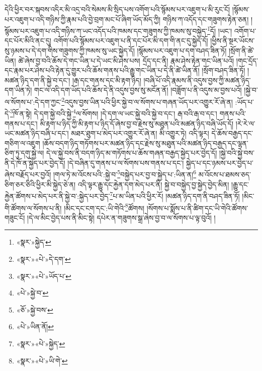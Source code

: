 དེའི་ཕྱིར་བར་སྐབས་འདིར་མི་འདྲ་བའི་སེམས་མི་སྲིད་པས་འགོག་པའི་སྙོམས་པར་འཇུག་པ་མི་རུང་ངོ། །སྙོམས་པར་འཇུག་པ་འདི་གཉིས་ཀྱི་རྣམ་པའི་བྱེ་བྲག་མང་པོ་ཞིག་ཡོད་མོད་ཀྱི། གཉིས་ཀ་འདོད་དང་གཟུགས་རྟེན་ཅན། །སྙོམས་པར་འཇུག་པ་འདི་གཉིས་ཀ་ཡང་འདོད་པའི་ཁམས་དང་གཟུགས་ཀྱི་ཁམས་སུ་བསྐྱེད་\footnote{«སྣར་»སྐྱེད་}དོ། །ཡང་། འགོག་པ་དང་པོར་མིའི་ནང་དུ། འགོག་པའི་སྙོམས་པར་འཇུག་པ་ནི་དང་པོར་མི་དག་གི་ནང་དུ་སྐྱེད་དོ། །ཕྱིས་ནི་སྔར་ཡོངས་སུ་ཉམས་པ་དེ་དག་གིས་གཟུགས་ཀྱི་ཁམས་སུ་ཡང་སྐྱེད་དོ། །སྙོམས་པར་འཇུག་པ་དག་བཤད་ཟིན་ཏོ། །སྲོག་ནི་ཚེ་ཡིན། ཚེ་ཞེས་བྱ་བའི་ཆོས་དེ་གང་ཡིན་པ་དེ་ཡང་མི་ཤེས་པས། དྲོད་དང་ནི། རྣམ་ཤེས་རྟེན་གང་ཡིན་པའོ། །གང་དྲོད་དང་རྣམ་པར་ཤེས་པའི་རྟེན་དུ་གྱུར་པའི་ཆོས་གནས་པའི་རྒྱུ་གང་ཡིན་པ་དེ་ནི་ཚེ་ཡིན་ནོ། །སྲོག་བཤད་ཟིན་ཏོ། །མཚན་ཉིད་དག་ནི་སྐྱེ་བ་དང་། །རྒ་དང་གནས་དང་མི་རྟག་ཉིད། །བཞི་པོ་འདི་རྣམས་ནི་འདུས་བྱས་ཀྱི་མཚན་ཉིད་དག་ཡིན་ཏེ། གང་ལ་འདི་དག་ཡོད་པའི་ཆོས་དེ་ནི་འདུས་བྱས་སུ་མངོན་ནོ། །བཟློག་པ་ནི་འདུས་མ་བྱས་པའོ། །སྐྱེ་བ་ལ་སོགས་པ་:དེ་དག་ཀྱང་\footnote{«སྣར་»«པེ་»དེ་དག་}འདུས་བྱས་ཡིན་པའི་ཕྱིར་སྐྱེ་བ་ལ་སོགས་པ་གཞན་ཡོད་པར་འགྱུར་རོ་ཞེ་ན། :ཡོད་པ་དེ་\footnote{«སྣར་»«པེ་»ཡོད་པ་}ཁོ་ན་སྟེ། དེ་དག་སྐྱེ་བའི་སྐྱེ་\footnote{«པེ་»སྐྱེ་བ་}ལ་སོགས། །དེ་དག་ལ་ཡང་སྐྱེ་བའི་སྐྱེ་བ་དང་། རྒ་བའི་རྒ་བ་དང་། གནས་པའི་གནས་པ་དང་། མི་རྟག་པ་ཉིད་ཀྱི་མི་རྟག་པ་ཉིད་དོ་ཞེས་བྱ་བ་རྗེས་སུ་མཐུན་པའི་མཚན་ཉིད་བཞི་ཡོད་དོ། །རེ་རེ་ལ་ཡང་མཚན་ཉིད་བཞི་པ་དང་། མཐར་ཐུག་པ་མེད་པར་འགྱུར་རོ་ཞེ་ན། མི་འགྱུར་ཏེ། འདི་ལྟར། དེ་ཆོས་བརྒྱད་དང་གཅིག་ལ་འཇུག །ཆོས་བདག་ཉིད་གཏོགས་པར་མཚན་ཉིད་དང་རྗེས་སུ་མཐུན་པའི་མཚན་ཉིད་བརྒྱད་དང་ལྷན་ཅིག་ཏུ་དགུ་སྐྱེ་ལ། དེ་ལ་སྐྱེ་བས་ནི་བདག་ཉིད་མ་གཏོགས་པ་ཆོས་གཞན་བརྒྱད་སྐྱེད་པར་བྱེད་དོ། །སྐྱེ་བའི་སྐྱེ་བས་ནི་དེ་ཁོ་ན་སྐྱེད་པར་བྱེད་དོ། །དེ་བཞིན་དུ་གནས་པ་ལ་སོགས་པས་གནས་པ་དང་། སྐྱེད་པ་དང་ཉམས་པར་བྱེད་པ་ཞེས་བརྗོད་པར་བྱའོ། །གལ་ཏེ་མ་འོངས་པའི་:སྐྱེ་བ་\footnote{«ཅོ་»སྐྱེ་བས་}བསྐྱེད་པར་བྱ་བ་སྐྱེད་པ་:ཡིན་ན།\footnote{«པེ་»ཡིན་ནོ།} མ་འོངས་པ་ཐམས་ཅད་ཅིག་ཅར་ཅིའི་ཕྱིར་མི་སྐྱེད་ཅེ་ན། འདི་ལྟར་རྒྱུ་དང་རྐྱེན་དག་མེད་པར་ནི། སྐྱེ་བ་བསྐྱེད་བྱ་སྐྱེད་བྱེད་མིན། །རྒྱུ་དང་རྐྱེན་ཚོགས་པ་མེད་པར་ནི་སྐྱེ་བ་:སྐྱེད་པར་བྱེད་\footnote{«སྣར་»«པེ་»སྐྱེད་}པ་མ་ཡིན་པའི་ཕྱིར་རོ། །མཚན་ཉིད་དག་ནི་བཤད་ཟིན་ཏོ། །མིང་གི་ཚོགས་ལ་སོགས་པ་ནི། །མིང་དང་ངག་དང་:ཡི་གེའི་\footnote{«སྣར་»«པེ་»ཡི་གེ་}ཚོགས། །སོགས་པ་སྨོས་པ་ནི་ཚིག་དང་ཡི་གེའི་ཚོགས་གཟུང་ངོ། །དེ་ལ་མིང་བྱེད་པས་ནི་མིང་སྟེ། དཔེར་ན་གཟུགས་སྒྲ་ཞེས་བྱ་བ་ལ་སོགས་པ་ལྟ་བུའོ། །
